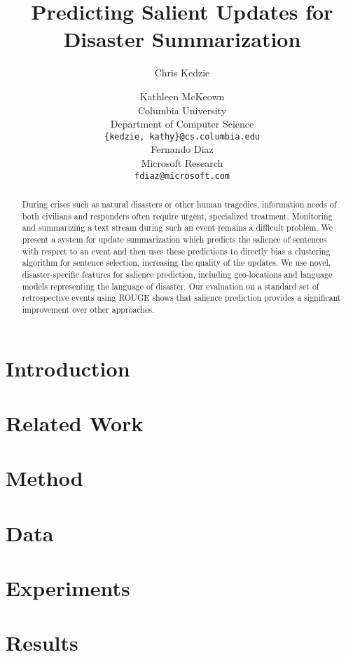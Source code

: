 \documentclass[11pt]{article}
\title{Predicting Salient Updates for Disaster Summarization}
\author{Chris Kedzie \and Kathleen McKeown\\
Columbia University\\
Department of Computer Science\\
{\tt \{kedzie, kathy\}@cs.columbia.edu} \\\And
 Fernando Diaz\\
 Microsoft Research\\
  {\tt fdiaz@microsoft.com} \\ 
  }
\date{}
\begin{document}
\maketitle
\begin{abstract}
During crises such as natural disasters or other human tragedies, information
needs of both civilians and responders often require urgent, specialized
treatment.  
Monitoring and summarizing a text stream
during such an event remains a difficult problem. 
We present a system for update summarization which predicts the salience of 
sentences with respect to an event and then uses these
predictions to directly bias a clustering algorithm for sentence selection,
increasing the quality of the updates. We use novel, disaster-specific features
for salience prediction, including geo-locations and language models
representing the language of disaster.
Our evaluation on a standard set of retrospective events using ROUGE shows 
that salience prediction provides a significant improvement over 
other approaches.

\end{abstract}

\section{Introduction}



\section{Related Work}


\section{Method}


\section{Data}
\label{sec:data}


\section{Experiments}
\label{sec:exper}


\section{Results}
\label{sec:results}

\end{document}
